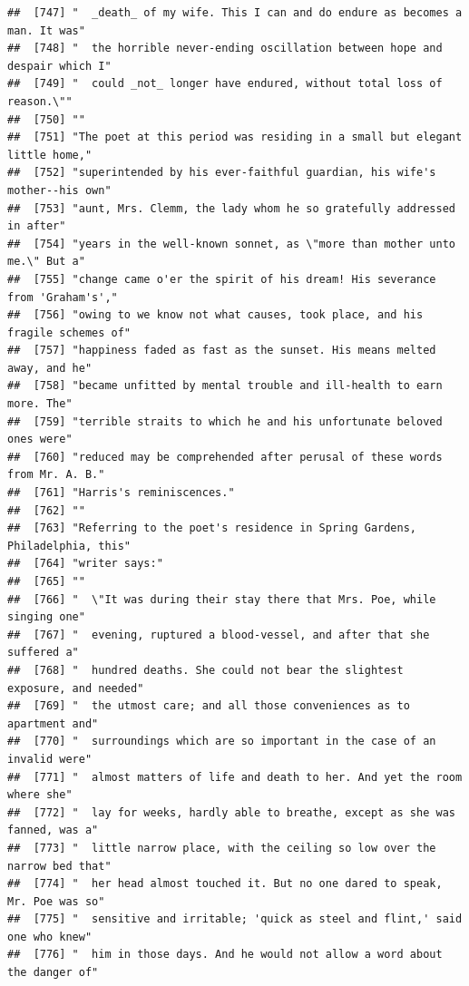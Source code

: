 \documentclass{article}\usepackage[]{graphicx}\usepackage[]{color}
\makeatletter
\newenvironment{kframe}{%
 \def\at@end@of@kframe{}%
 \ifinner\ifhmode%
  \def\at@end@of@kframe{\end{minipage}}%
  \begin{minipage}{\columnwidth}%
 \fi\fi%
 \def\FrameCommand##1{\hskip\@totalleftmargin \hskip-\fboxsep
 \colorbox{shadecolor}{##1}\hskip-\fboxsep
     \hskip-\linewidth \hskip-\@totalleftmargin \hskip\columnwidth}%
 \MakeFramed {\advance\hsize-\width
   \@totalleftmargin\z@ \linewidth\hsize
   \@setminipage}}%
 {\par\unskip\endMakeFramed%
 \at@end@of@kframe}
\newenvironment{knitrout}{}{} %
\makeatother
\begin{document}
\begin{knitrout}
\begin{kframe}
\begin{verbatim}
##  [747] "  _death_ of my wife. This I can and do endure as becomes a man. It was"     
##  [748] "  the horrible never-ending oscillation between hope and despair which I"    
##  [749] "  could _not_ longer have endured, without total loss of reason.\""          
##  [750] ""                                                                            
##  [751] "The poet at this period was residing in a small but elegant little home,"    
##  [752] "superintended by his ever-faithful guardian, his wife's mother--his own"     
##  [753] "aunt, Mrs. Clemm, the lady whom he so gratefully addressed in after"         
##  [754] "years in the well-known sonnet, as \"more than mother unto me.\" But a"      
##  [755] "change came o'er the spirit of his dream! His severance from 'Graham's',"    
##  [756] "owing to we know not what causes, took place, and his fragile schemes of"    
##  [757] "happiness faded as fast as the sunset. His means melted away, and he"        
##  [758] "became unfitted by mental trouble and ill-health to earn more. The"          
##  [759] "terrible straits to which he and his unfortunate beloved ones were"          
##  [760] "reduced may be comprehended after perusal of these words from Mr. A. B."     
##  [761] "Harris's reminiscences."                                                     
##  [762] ""                                                                            
##  [763] "Referring to the poet's residence in Spring Gardens, Philadelphia, this"     
##  [764] "writer says:"                                                                
##  [765] ""                                                                            
##  [766] "  \"It was during their stay there that Mrs. Poe, while singing one"         
##  [767] "  evening, ruptured a blood-vessel, and after that she suffered a"           
##  [768] "  hundred deaths. She could not bear the slightest exposure, and needed"     
##  [769] "  the utmost care; and all those conveniences as to apartment and"           
##  [770] "  surroundings which are so important in the case of an invalid were"        
##  [771] "  almost matters of life and death to her. And yet the room where she"       
##  [772] "  lay for weeks, hardly able to breathe, except as she was fanned, was a"    
##  [773] "  little narrow place, with the ceiling so low over the narrow bed that"     
##  [774] "  her head almost touched it. But no one dared to speak, Mr. Poe was so"     
##  [775] "  sensitive and irritable; 'quick as steel and flint,' said one who knew"    
##  [776] "  him in those days. And he would not allow a word about the danger of"      

\end{verbatim}
\end{kframe}
\end{knitrout}
\end{document}
